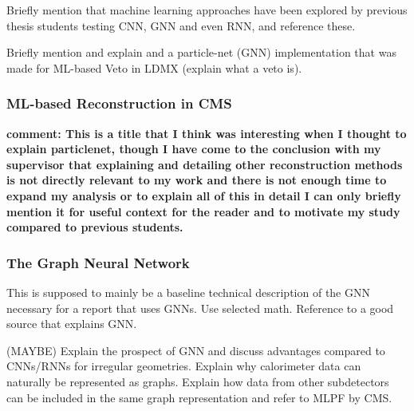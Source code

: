 Briefly mention that machine learning approaches have been explored by previous thesis students testing CNN, GNN and even RNN, and reference these.

Briefly mention and explain and a particle-net (GNN) implementation that was made for ML-based Veto in LDMX (explain what a veto is).


\subsubsection{ML-based Reconstruction in CMS}

\textbf{comment: This is a title that I think was interesting when I thought to explain particlenet, though I have come to the conclusion with my supervisor that explaining and detailing other reconstruction methods is not directly relevant to my work and there is not enough time to expand my analysis or to explain all of this in detail I can only briefly mention it for useful context for the reader and to motivate my study compared to previous students.}



\subsubsection{The Graph Neural Network}

This is supposed to mainly be a baseline technical description of the GNN necessary for a report that uses GNNs. Use selected math. Reference to a good source that explains GNN.

(MAYBE) Explain the prospect of GNN and discuss advantages compared to CNNs/RNNs for irregular geometries. Explain why calorimeter data can naturally be represented as graphs. Explain how data from other subdetectors can be included in the same graph representation and refer to MLPF by CMS.

